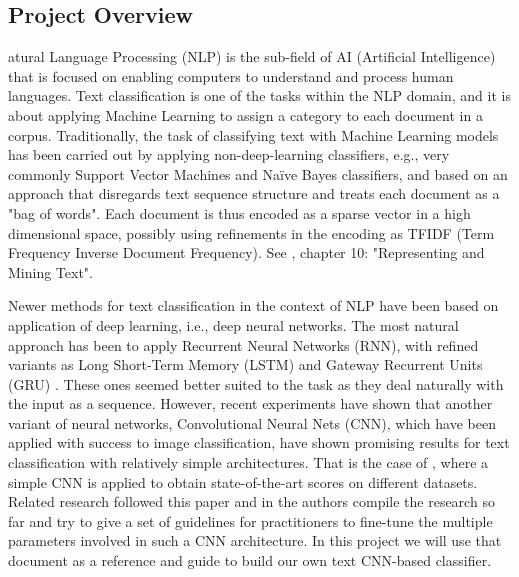 \documentclass[10pt,journal,compsoc, onecolumn]{IEEEtran}
\begin{document}
\subsection{Project Overview}




atural Language Processing (NLP) is the sub-field of AI (Artificial Intelligence) that is focused on enabling computers to understand and process human languages. Text classification is one of the tasks within the NLP domain, and it is about applying Machine Learning to assign a category to each document in a corpus. Traditionally, the task of classifying text with Machine Learning models has been carried out by applying non-deep-learning classifiers, e.g., very commonly Support Vector Machines and Naïve Bayes classifiers, and based on an approach that disregards text sequence structure and treats each document as a "bag of words". Each document is thus encoded as a sparse vector in a high dimensional space, possibly using refinements in the encoding as TFIDF (Term Frequency Inverse Document Frequency). See \cite{Provost}, chapter 10: "Representing and Mining Text".

Newer methods for text classification in the context of NLP have been based on application of deep learning, i.e., deep neural networks. The most natural approach has been to apply Recurrent Neural Networks (RNN), with refined variants as Long Short-Term Memory (LSTM) and Gateway Recurrent Units (GRU) \cite{Chollet}. These ones seemed better suited to the task as they deal naturally with the input as a sequence. However, recent experiments have shown that another variant of neural networks, Convolutional Neural Nets (CNN), which have been applied with success to image classification, have shown promising results for text classification with relatively simple architectures. That is the case of \cite{Kim}, where a simple CNN is applied to obtain state-of-the-art scores on different datasets. Related research followed this paper and in \cite{Zhang} the authors compile the research so far and try to give a set of guidelines for practitioners to fine-tune the multiple parameters involved in such a CNN architecture. In this project we will use that document as a reference and guide to build our own text CNN-based classifier.
\end{document}
